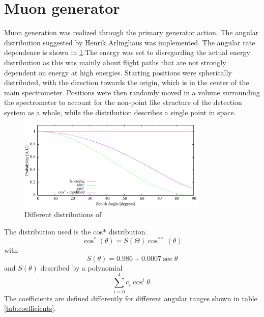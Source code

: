   
  \section{Muon generator}
  \label{ch:Simulation software:sec:Muon generator}
  
  Muon generation was realized through the primary generator action. The angular distribution suggested by Henrik Arlinghaus \cite{DTArlinghaus} was implemented. The angular rate dependence is shown in \ref{fig:rateDependance}.The energy was set to  disregarding the actual energy distribution as this was mainly about flight paths that are not strongly dependent on energy at high energies. Starting positions were spherically distributed, with the direction towards the origin, which is in the center of the main spectrometer. Positions were then randomly moved in a volume surrounding the spectrometer to account for the non-point like structure of the detection system as a whole, while the distribution describes a single point in space.
  \begin{figure}
  \centering
  \includegraphics[width = 0.8\textwidth]{graphics/simulation/angularDistributions.eps}
  	\caption[Muon rate dependance on zenith angle]{Different distributions of }
  	\label{fig:rateDependance}
  \end{figure}
  The distribution used is the cos* distribution.
  \begin{equation}
  	\cos^*{\left(\theta \right)} = S(\Theta)\cos^{**}{\left(\theta\right)}
  \end{equation}
  with
  \begin{equation}
  	S(\theta) = 0.986 + 0.0007\sec{\theta}
  \end{equation}
  and $S(\theta)$ described by a polynomial
  \begin{equation}
  	\sum_{i=0}^{4}{c_i \cos^i{\theta}}.
  	\label{eq:coeffs}
  \end{equation}
  The coefficients are defined differently for different angular ranges shown in table \ref{tab:coefficients}.
